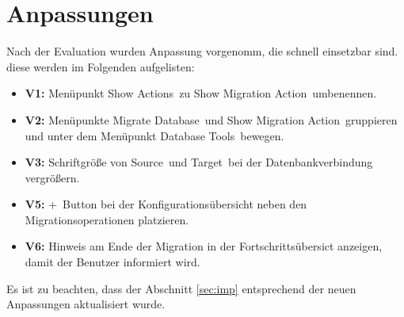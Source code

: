 %	
%		

\section{Anpassungen}
Nach der Evaluation wurden Anpassung vorgenomm, die schnell einsetzbar sind. diese werden im Folgenden aufgelisten:
\begin{itemize}
	\item \textbf{V1:} Menüpunkt \glqq Show Actions\grqq\, zu \glqq Show Migration Action\grqq\, umbenennen.
	\item \textbf{V2:} Menüpunkte \glqq Migrate Database\grqq\, und \glqq Show Migration Action\grqq\, gruppieren und unter dem Menüpunkt \glqq Database Tools\grqq\, bewegen. 
	\item \textbf{V3:} Schriftgröße von \glqq Source\grqq\, und \glqq Target\grqq\, bei der Datenbankverbindung vergrößern. 
	\item \textbf{V5:} \glqq +\grqq\, Button bei der Konfigurationsübersicht neben den Migrationsoperationen platzieren.
	\item \textbf{V6:} Hinweis am Ende der Migration in der Fortschrittsübersict anzeigen, damit der Benutzer informiert wird.
\end{itemize}
Es ist zu beachten, dass der Abschnitt \ref{sec:imp} entsprechend der neuen Anpassungen aktualisiert wurde.